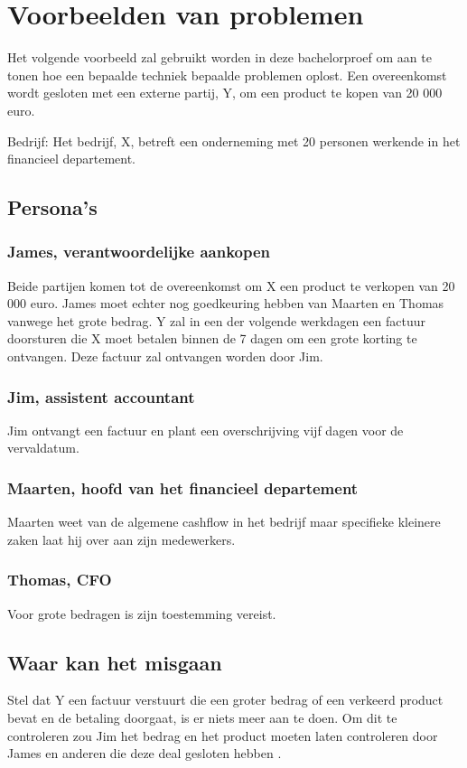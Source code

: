 \chapter{Voorbeelden van problemen}
\label{ch:voorbeelden-van-problemen}

Het volgende voorbeeld zal gebruikt worden in deze bachelorproef om aan te tonen
hoe een bepaalde techniek bepaalde problemen oplost.
Een overeenkomst wordt gesloten met een externe partij, Y, om een product te
kopen van 20 000 euro.

Bedrijf: Het bedrijf, X, betreft een onderneming met 20 personen werkende in het
financieel departement.

\section{Persona’s}

\subsection{James, verantwoordelijke aankopen}
Beide partijen komen tot de overeenkomst om X een product te verkopen van 20 000
euro. James moet echter nog goedkeuring hebben van Maarten en Thomas vanwege het
grote bedrag. Y zal in een der volgende werkdagen een factuur doorsturen die X
moet betalen binnen de 7 dagen om een grote korting te ontvangen. Deze factuur
zal ontvangen worden door Jim.

\subsection{Jim, assistent accountant}
Jim ontvangt een factuur en plant een overschrijving vijf dagen voor de
vervaldatum.

\subsection{Maarten, hoofd van het financieel departement}
Maarten weet van de algemene cashflow in het bedrijf maar specifieke kleinere
zaken laat hij over aan zijn medewerkers.

\subsection{Thomas, CFO}
Voor grote bedragen is zijn toestemming vereist.

\section{Waar kan het misgaan}
Stel dat Y een factuur verstuurt die een groter bedrag of een verkeerd product
bevat en de betaling doorgaat, is er niets meer aan te doen. Om dit te
controleren zou Jim het bedrag en het product moeten laten controleren door
James en anderen die deze deal gesloten hebben \autocite{VanDenBulckeTom}.

